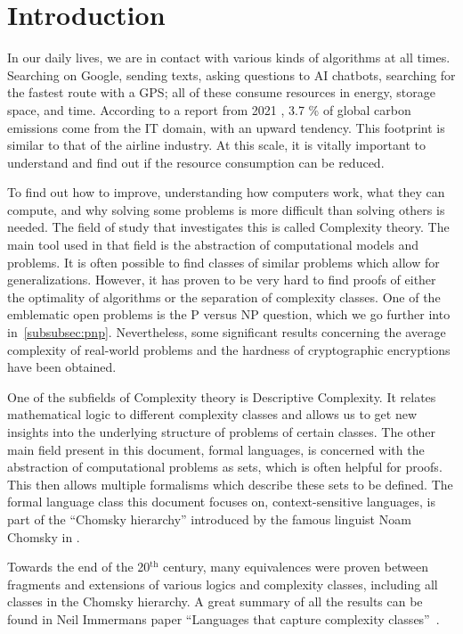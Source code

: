 \chapter{Introduction}\label{ch:intro}

In our daily lives, we are in contact with various kinds of algorithms at all times.
Searching on Google, sending texts, asking questions to \acs{AI} chatbots, searching for the fastest route with a \acs{GPS}; all of these consume resources in energy, storage space, and time.
According to a report from 2021 \cite{webFootprint}, 3.7 \% of global carbon emissions come from the \acs{IT} domain, with an upward tendency.
This footprint is similar to that of the airline industry.
At this scale, it is vitally important to understand and find out if the resource consumption can be reduced.

To find out how to improve, understanding how computers work, what they can compute, and why solving some problems is more difficult than solving others is needed.
The field of study that investigates this is called Complexity theory.
The main tool used in that field is the abstraction of computational models and problems.
It is often possible to find classes of similar problems which allow for generalizations.
However, it has proven to be very hard to find proofs of either the optimality of algorithms or the separation of complexity classes.
One of the emblematic open problems is the \acs{P} versus \acs{NP} question, which we go further into in~\cref{subsubsec:pnp}.
Nevertheless, some significant results concerning the average complexity of real-world problems and the hardness of cryptographic encryptions have been obtained.

One of the subfields of Complexity theory is Descriptive Complexity.
It relates mathematical logic to different complexity classes and allows us to get new insights into the underlying structure of problems of certain classes.
The other main field present in this document, formal languages, is concerned with the abstraction of computational problems as sets, which is often helpful for proofs.
This then allows multiple formalisms which describe these sets to be defined.
The formal language class this document focuses on, context-sensitive languages, is part of the ``Chomsky hierarchy'' introduced by the famous linguist Noam Chomsky in \cite{Chomsky1959}.

Towards the end of the 20$^{\text{th}}$ century, many equivalences were proven between fragments and extensions of various logics and complexity classes, including all classes in the Chomsky hierarchy.
A great summary of all the results can be found in Neil Immermans paper ``Languages that capture complexity classes''~\cite{Immerman1987}.

